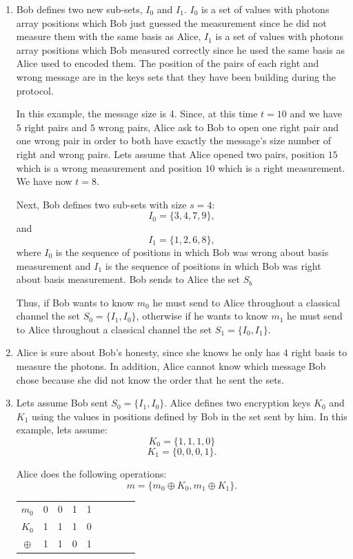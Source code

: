   \begin{enumerate}
  \item Bob defines two new sub-sets, $I_{0}$ and $I_{1}$. $I_{0}$ is a set of values with photons array positions which Bob just guessed the measurement since he did not measure them with the same basis as Alice, $I_{1}$ is a set of values with photons array positions which Bob measured correctly since he used the same basis as Alice used to encoded them. The position of the pairs of each right and wrong message are in the keys sets that they have been building during the protocol.

  In this example, the message size is 4. Since, at this time $t=10$ and we have $5$ right pairs and $5$ wrong pairs, Alice ask to Bob to open one right pair and one wrong pair in order to both have exactly the message's size number of right and wrong pairs. Lets assume that Alice opened two pairs, position $15$ which is a wrong measurement and position $10$ which is a right measurement. We have now $t=8$.

  Next, Bob defines two sub-sets with size $s=4$:
  $$I_{0}=\{3,4,7,9 \},$$
  and $$I_{1}= \{1,2,6,8 \},$$ where $I_{0}$ is the sequence of positions in which Bob was wrong about basis measurement and $I_{1}$ is the sequence of positions in which Bob was right about basis measurement. Bob sends to Alice the set $S_{b}$

  Thus, if Bob wants to know $m_{0}$ he must send to Alice throughout a classical channel the set $S_{0}=\{I_{1},I_{0} \}$, otherwise if he wants to know $m_{1}$ he must send to Alice throughout a classical channel the set $S_{1}=\{I_{0},I_{1} \}$.


  \item Alice is sure about Bob's honesty, since she knows he only has $4$ right basis to measure the photons. In addition, Alice cannot know which message Bob chose because she did not know the order that he sent the sets.

  \item Lets assume Bob sent $S_{0}=\{I_{1},I_{0} \}$.
   Alice defines two encryption keys $K_{0}$ and $K_{1}$ using the values in positions defined by Bob in the set sent by him. In this example, lets assume: $$K_{0}=\{1,1,1,0\}$$ $$K_{1}=\{0,0,0,1\}.$$

   Alice does the following operations:
   $$m = \{m_{0}\oplus K_{0}, m_{1} \oplus K_{1} \}.$$

   \begin{table}[H]
    \centering
    \begin{tabular}{c|c c c c c c c c}
     $m_{0}$ & 0 & 0 & 1 & 1 \\
     $K_{0}$ & 1 & 1 & 1 & 0 \\ \hline
     $\oplus$ & 1 & 1 & 0 & 1
    \end{tabular}
    \end{table}


\end{enumerate}
